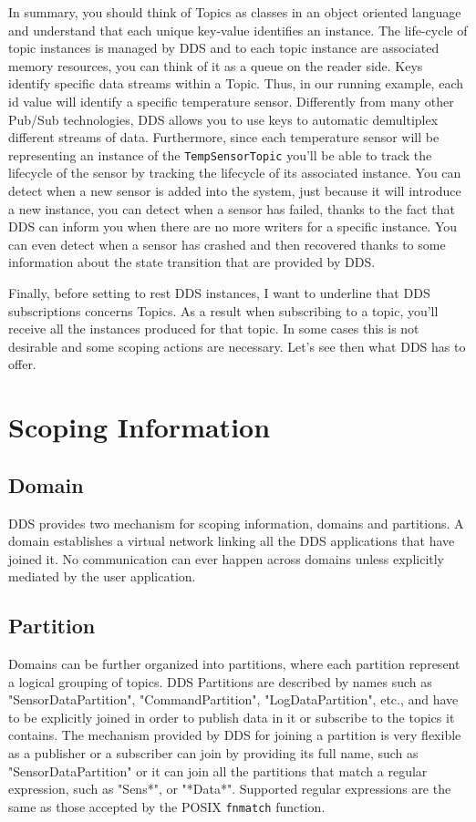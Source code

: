 In summary, you should think of Topics as classes in an object oriented 
language and understand that each unique key-value identifies an instance. 
The life-cycle of topic instances is managed by DDS and to each topic instance 
are associated memory resources, you can think of it as a queue on the reader side.  
Keys identify specific data streams within a Topic. Thus, in our running example, 
each id value will identify a specific temperature sensor. 
Differently from many other \ac{Pub/Sub} technologies, \ac{DDS} allows you to 
use keys to automatic demultiplex different streams of data. 
Furthermore, since each temperature sensor will be representing an instance of 
the \texttt{TempSensorTopic} you'll be able to track the lifecycle of the sensor 
by tracking the lifecycle of its associated instance. 
You can detect when a new sensor is added into the system, just because 
it will introduce a new instance, you can detect when a sensor has failed, 
thanks to the fact that DDS can inform you when there are no more writers for a 
specific instance. You can even detect when a sensor has crashed and then recovered 
thanks to some information about the state transition that are provided by \ac{DDS}. 

Finally, before setting to rest \ac{DDS} instances, I want to underline 
that \ac{DDS} subscriptions concerns Topics. As a result when subscribing to a topic, 
you'll receive all the instances produced for that topic.  In some cases this is 
not desirable and some scoping actions are necessary. Let's see then what DDS has to offer.

\section{Scoping Information}\label{Section:Scoping:Information}
\subsection{Domain}
DDS provides two mechanism for scoping information, domains and partitions.
A domain establishes a virtual network linking all the \ac{DDS} applications 
that have joined it. 
No communication can ever happen across domains unless explicitly mediated 
by the user application. 
\subsection{Partition}
Domains can be further organized into partitions, where each partition represent 
a logical grouping of topics. DDS Partitions are described by names such 
as "SensorDataPartition", "CommandPartition", "LogDataPartition", etc., 
and have to be explicitly joined in order to publish data in it or subscribe 
to the topics it contains. The mechanism provided by \ac{DDS} for joining a 
partition is very flexible as a publisher or a subscriber can join by providing 
its full name, such as "SensorDataPartition" or it can join all the partitions 
that match a regular expression, such as "Sens*", or "*Data*". 
Supported regular expressions are the same as those accepted by the POSIX 
\texttt{fnmatch} \cite{POSIX:fmatch} function. 

